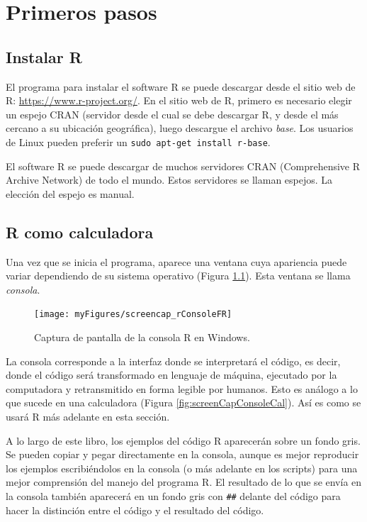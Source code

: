 \documentclass[
]{book}
\begin{document}
\hypertarget{premiersPas}{%
\chapter{Primeros pasos}\label{premiersPas}}

\hypertarget{instalar-r}{%
\section{Instalar R}\label{instalar-r}}

El programa para instalar el software R se puede descargar desde el sitio web de R: \url{https://www.r-project.org/}. En el sitio web de R, primero es necesario elegir un espejo CRAN (servidor desde el cual se debe descargar R, y desde el más cercano a su ubicación geográfica), luego descargue el archivo \emph{base}. Los usuarios de Linux pueden preferir un \texttt{sudo\ apt-get\ install\ r-base}.

El software R se puede descargar de muchos servidores CRAN (Comprehensive R Archive Network) de todo el mundo. Estos servidores se llaman espejos. La elección del espejo es manual.

\hypertarget{r-como-calculadora}{%
\section{R como calculadora}\label{r-como-calculadora}}

Una vez que se inicia el programa, aparece una ventana cuya apariencia puede variar dependiendo de su sistema operativo (Figura \ref{fig:screenCapConsole}). Esta ventana se llama \emph{consola}.

\begin{figure}
\texttt{[image: myFigures/screencap\_rConsoleFR]} \caption{Captura de pantalla de la consola R en Windows.\label{fig:screenCapConsole}}\label{fig:screenCapConsole}
\end{figure}

La consola corresponde a la interfaz donde se interpretará el código, es decir, donde el código será transformado en lenguaje de máquina, ejecutado por la computadora y retransmitido en forma legible por humanos. Esto es análogo a lo que sucede en una calculadora (Figura \ref{fig:screenCapConsoleCal}). Así es como se usará R más adelante en esta sección.

A lo largo de este libro, los ejemplos del código R aparecerán sobre un fondo gris. Se pueden copiar y pegar directamente en la consola, aunque es mejor reproducir los ejemplos escribiéndolos en la consola (o más adelante en los scripts) para una mejor comprensión del manejo del programa R. El resultado de lo que se envía en la consola también aparecerá en un fondo gris con \texttt{\#\#} delante del código para hacer la distinción entre el código y el resultado del código.
\end{document}
